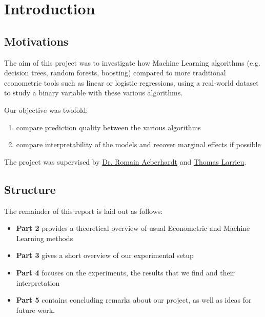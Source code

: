 \chapter{Introduction}

\section{Motivations}
The aim of this project was to investigate how Machine Learning algorithms (e.g. decision trees, random forests, boosting) compared to more traditional econometric tools such as linear or logistic regressions, using a real-world dataset \cite{enquete} to study a binary variable with these various algorithms.

Our objective was twofold:
\begin{enumerate}[nosep]
    \item compare prediction quality between the various algorithms
    \item compare interpretability of the models and recover marginal effects if possible
\end{enumerate}

The project was supervised by \href{http://www.crest.fr/pagesperso.php?user=3045}{Dr. Romain Aeberhardt} and \href{http://thomas-larrieu.strikingly.com/}{Thomas Larrieu}.

\section{Structure}
The remainder of this report is laid out as follows:
    \begin{itemize}
        \item \textbf{Part 2} provides a theoretical overview of usual Econometric and Machine Learning methods
        \item \textbf{Part 3} gives a short overview of our experimental setup
        \item \textbf{Part 4} focuses on the experiments, the results that we find and their interpretation
        \item \textbf{Part 5} contains concluding remarks about our project, as well as ideas for future work.
    \end{itemize}
